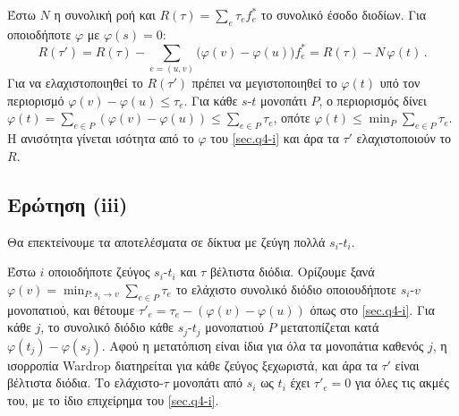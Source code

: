 Έστω $N$ η συνολική ροή και $R(\tau) = \sum_e \tau_e f^*_e$ το συνολικό έσοδο
διοδίων. Για οποιοδήποτε $\varphi$ με $\varphi(s) = 0$:
$$
  R(\tau') = R(\tau) - \sum_{e=(u,v)} \bigl(\varphi(v) - \varphi(u)\bigr) f^*_e
  = R(\tau) - N\,\varphi(t) \,.
$$
Για να ελαχιστοποιηθεί το $R(\tau')$ πρέπει να μεγιστοποιηθεί το $\varphi(t)$
υπό τον περιορισμό $\varphi(v) - \varphi(u) \leq \tau_e$. Για κάθε $s$-$t$
μονοπάτι $P$, ο περιορισμός δίνει
$\varphi(t) = \sum_{e \in P}(\varphi(v) - \varphi(u)) \leq \sum_{e \in P} \tau_e$,
οπότε $\varphi(t) \leq \min_P \sum_{e \in P} \tau_e$. Η ανισότητα γίνεται
ισότητα από το $\varphi$ του \ref{sec.q4-i} και άρα τα $\tau'$ ελαχιστοποιούν το
$R$.

\subsection{Ερώτηση (iii)}

Θα επεκτείνουμε τα αποτελέσματα σε δίκτυα με ζεύγη πολλά $s_i$-$t_i$.

Έστω $i$ οποιοδήποτε ζεύγος $s_i$-$t_i$ και $\tau$ βέλτιστα διόδια. Ορίζουμε
ξανά $\varphi(v) = \min_{P \colon s_i \to v} \sum_{e \in P} \tau_e$
το ελάχιστο συνολικό διόδιο οποιουδήποτε $s_i$-$v$ μονοπατιού, και θέτουμε
$\tau'_e = \tau_e - (\varphi(v) - \varphi(u))$ όπως στο \ref{sec.q4-i}. Για κάθε
$j$, το συνολικό διόδιο κάθε $s_j$-$t_j$ μονοπατιού $P$ μετατοπίζεται
κατά $\varphi(t_j) - \varphi(s_j)$. Αφού η μετατόπιση είναι ίδια για όλα τα
μονοπάτια καθενός $j$, η ισορροπία Wardrop διατηρείται για κάθε ζεύγος
ξεχωριστά, και άρα τα $\tau'$ είναι βέλτιστα διόδια. Το ελάχιστο-$\tau$ μονοπάτι
από $s_i$ ως $t_i$ έχει $\tau'_e = 0$ για όλες τις ακμές του, με το ίδιο
επιχείρημα του \ref{sec.q4-i}.
